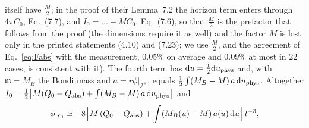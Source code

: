 \documentclass[11pt]{article}
\begin{document}
itself have $\tfrac M2$; in the proof of their Lemma~7.2 the horizon term enters through $4\pi C_0$, Eq.~(7.7), and $I_0=\dots+MC_0$, Eq.~(7.6), so that $\tfrac M2$ is the prefactor that follows from the proof (the dimensions require it as well) and the factor $M$ is lost only in the printed statements (4.10) and (7.23); we use $\tfrac M2$, and the agreement of Eq.~\eqref{eq:Fabs} with the measurement, $0.05\%$ on average and $0.09\%$ at most in $22$ cases, is consistent with it). The fourth term has $\mathrm du=\tfrac12\mathrm du_{\rm phys}$ and, with $\mathfrak m=M_B$ the Bondi mass and $a=r\phi|_{\mathcal I^{+}}$, equals $\tfrac12\int(M_B-M)\,a\,\mathrm du_{\rm phys}$. Altogether $I_0=\tfrac12\bigl[M(Q_0-Q_{\rm abs})+\int(M_B-M)\,a\,\mathrm du_{\rm phys}\bigr]$ and
\begin{equation}\phi|_{r_0}\simeq-8\Bigl[M\,(Q_0-Q_{\rm abs})+\int (M_B(u)-M)\,a(u)\,\mathrm du\Bigr]\,t^{-3},\label{eq:combined}\end{equation}
\end{document}
